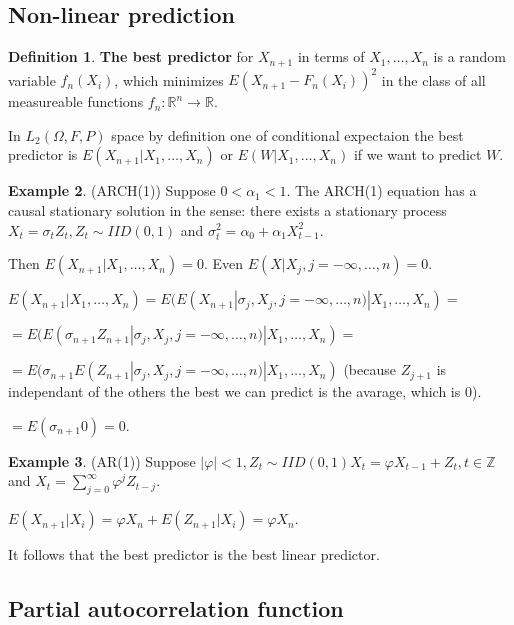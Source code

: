 \documentclass[12pt,a4paper]{amsart}
\theoremstyle{definition} %
\newtheorem{defn}{Definition}[section]
\newtheorem{example}[defn]{Example}
\theoremstyle{plain} %
\newcommand{\R}{\mathbb R}
\newcommand{\Z}{\mathbb Z}
\begin{document}
\subsection{Non-linear prediction}

\begin{defn}
{\bf The best predictor} for $X_{n+1}$ in terms of $X_1, \dots, X_n$ is a random variable $f_n(X_i)$, which minimizes 
$E(X_{n+1}- F_n(X_i))^2$ in the class of all measureable functions $f_n: \R^n \rightarrow \R$. 
\end{defn}

In $L_2(\Omega, F, P)$ space by definition one of conditional expectaion the best predictor is
$E(X_{n+1} | X_1, \dots, X_n)$ or $E(W | X_1, \dots, X_n)$ if we want to predict $W$. 

\begin{example} (ARCH(1))
Suppose $0< \alpha_1 < 1$. The ARCH(1) equation has a causal stationary solution in the sense:
there exists a stationary process $X_t = \sigma_t Z_t, Z_t \sim IID(0,1)$ and $\sigma_t^2 = \alpha_0 + \alpha_1 X_{t-1}^2$. 

Then $E(X_{n+1} | X_1, \dots, X_n) = 0$. Even $E(X | X_j, j =-\infty, \dots, n) = 0$.

$E(X_{n+1} | X_1, \dots, X_n) = E(E(X_{n+1}|\sigma_j, X_j, j = -\infty, \dots, n)|X_1, \dots, X_n) = $

$=  E(E(\sigma_{n+1} Z_{n+1}|\sigma_j, X_j, j = -\infty, \dots, n)|X_1, \dots, X_n) = $

$=  E(\sigma_{n+1} E(Z_{n+1}|\sigma_j, X_j, j = -\infty, \dots, n)|X_1, \dots, X_n) $ (because $Z_{j+1}$ is independant of the others the best we can predict is the avarage, which is $0$).

$ = E(\sigma_{n+1} 0) = 0$.
\end{example}

\begin{example} (AR(1))
Suppose $|\varphi| < 1, Z_t \sim IID(0,1) X_t = \varphi X_{t-1} + Z_t, t\in \Z$ and $X_t = \sum_{j = 0}^\infty \varphi^j Z_{t-j}$.

$E(X_{n+1}|X_i) = \varphi X_n + E(Z_{n+1} | X_i) = \varphi X_n$.

It follows that the best predictor is the best linear predictor.
\end{example}

\subsection{Partial autocorrelation function}
\end{document}
